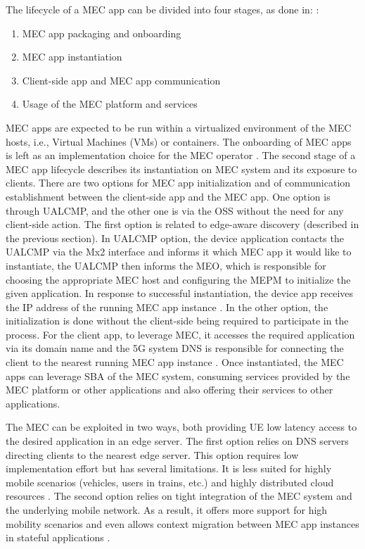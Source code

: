 \documentclass[12pt,a4paper,twoside]{report}
\begin{document}
The lifecycle of a MEC app can be divided into four stages, as done in: \cite{ETSI:wp20}:
\begin{enumerate}
	\item MEC app packaging and onboarding
	\item MEC app instantiation 
	\item Client-side app and MEC app communication 
	\item Usage of the MEC platform and services 
\end{enumerate}
MEC apps are expected to be run within a virtualized environment of the MEC hosts, i.e., Virtual Machines (VMs) or containers. The onboarding of MEC apps is left as an implementation choice for the MEC operator \cite{ETSI:wp20}. The second stage of a MEC app lifecycle describes its instantiation on MEC system and its exposure to clients. There are two options for MEC app initialization and of communication establishment between the client-side app and the MEC app. One option is through UALCMP, and the other one is via the OSS without the need for any client-side action. The first option is related to edge-aware discovery (described in the previous section). In UALCMP option, the device application contacts the UALCMP via the Mx2 interface and informs it which MEC app it would like to instantiate, the UALCMP then informs the MEO, which is responsible for choosing the appropriate MEC host and configuring the MEPM to initialize the given application. In response to successful instantiation, the device app receives the IP address of the running MEC app instance \cite{ETSI:wp20}. In the other option, the initialization is done without the client-side being required to participate in the process. For the client app, to leverage MEC, it accesses the required application via its domain name and the 5G system DNS is responsible for connecting the client to the nearest running MEC app instance \cite{ETSI:wp20,ETSI:wp36}. Once instantiated, the MEC apps can leverage SBA of the MEC system, consuming services provided by the MEC platform or other applications and also offering their services to other applications.

The MEC can be exploited in two ways, both providing UE low latency access to the desired application in an edge server. The first option relies on DNS servers directing clients to the nearest edge server. This option requires low implementation effort but has several limitations. It is less suited for highly mobile scenarios (vehicles, users in trains, etc.) and highly distributed cloud resources \cite{ETSI:wp36}. The second option relies on tight integration of the MEC system and the underlying mobile network. As a result, it offers more support for high mobility scenarios and even allows context migration between MEC app instances in stateful applications \cite{ETSI:wp36}.
\end{document}
